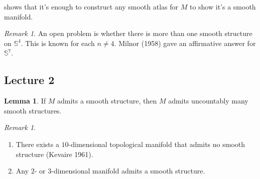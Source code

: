 \documentclass[10pt,letterpaper,cm]{nupset}
\theoremstyle{definition}
\theoremstyle{theorem}
\newtheorem{lemma}[definition]{Lemma}
\theoremstyle{remark}
\newtheorem{remark}[definition]{Remark}
\renewcommand{\S}{\mathbb S}
\newcommand{\1}{\mathbf{1}}
\newcommand{\0}{\vec 0}
\begin{document}
 shows that it's enough to construct any smooth atlas for $M$ to show it's a smooth manifold.


\begin{remark}{An open problem is whether there is more than one smooth structure on $\S^4$. This is known for each $n \ne 4$. Milnor (1958) gave an affirmative answer for $\S^7$.}
\end{remark}

\subsection{Lecture 2}

\theoremstyle{lemma}
\begin{lemma}{If $M$ admits a smooth structure, then $M$ admits uncountably many smooth structures.} 
\end{lemma}


\begin{remark} $ $
\begin{enumerate}
\item There exists a $10$-dimensional topological manifold that admits no smooth structure (Kevaire 1961).
\item Any $2$- or $3$-dimensional manifold admits a smooth structure.
\end{enumerate}
\end{remark}
\end{document}
